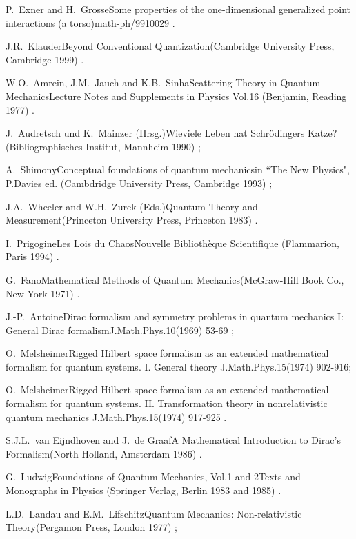 \documentclass[a4wide,12pt]{report}
\begin{document}
\begin{thebibliography}{22}
\bookref
{P.~Exner and H.~Grosse}{Some properties of the one-dimensional
generalized point interactions (a torso)}{math-ph/9910029 .}


\bookref
{J.R.~Klauder}{Beyond Conventional Quantization}{(Cambridge 
University Press, Cambridge 1999) .}

\bookref
{W.O.~Amrein, J.M.~Jauch and K.B.~Sinha}{Scattering Theory in
Quantum Mechanics}{Lecture Notes and Supplements in Physics Vol.16
(Benjamin, Reading 1977) .}

 
\bookref
{J.~Audretsch und K.~Mainzer (Hrsg.)}{Wieviele Leben hat Schr\"odingers
Katze?}{(Bibliographisches Institut, Mannheim 1990) ;}
 
\prepref
{A.~Shimony}{Conceptual foundations of quantum
mechanics}{in ``The New Physics", P.Davies ed. (Cambdridge
University Press, Cambridge 1993) ;}
 
\bookref
{J.A.~Wheeler and W.H.~Zurek (Eds.)}{Quantum Theory and
Measurement}{(Princeton University Press, Princeton 1983) .}

 
\bookref
{I.~Prigogine}{Les Lois du Chaos}{Nouvelle Biblioth\`eque
Scientifique (Flammarion, Paris 1994) .}

 
\bookref
{G.~Fano}{Mathematical Methods of Quantum Mechanics}{(McGraw-Hill
Book Co., New York 1971) .}

 
\artref
{J.-P.~Antoine}{Dirac formalism and symmetry problems in quantum
mechanics I: General
Dirac formalism}{J.Math.Phys.}{10}{(1969) 53-69 ;}
 
\artref
{O.~Melsheimer}{Rigged Hilbert space formalism as an extended
mathematical formalism for quantum systems. I. General theory}{
J.Math.Phys.}{15}{(1974) 902-916;}
 
\artref
{O.~Melsheimer}{Rigged Hilbert space formalism as an extended
mathematical formalism for quantum systems. II.
Transformation theory in nonrelativistic quantum mechanics}{
J.Math.Phys.}{15}{(1974) 917-925 .}


\bookref
{S.J.L.~van Eijndhoven and J.~de Graaf}{A Mathematical Introduction 
to Dirac's Formalism}{(North-Holland, Amsterdam 1986) .} 


\bookref
{G.~Ludwig}{Foundations of Quantum Mechanics, Vol.1 and 2}{Texts and
Monographs in Physics (Springer
Verlag, Berlin 1983 and 1985) .}
 
 
\bookref
{L.D.~Landau and E.M.~Lifschitz}{Quantum Mechanics: 
Non-relativistic Theo\-ry}{(Pergamon Press, London 1977) ;}
 

\end{thebibliography}
\end{document}
